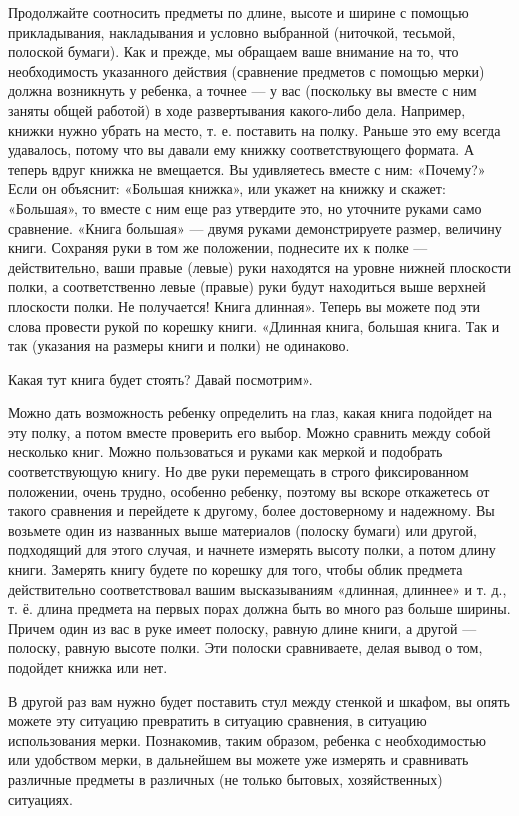 \documentclass{book}
\begin{document}
Продолжайте соотносить предметы по длине, высоте и ширине с помощью
прикладывания, накладывания и условно выбранной (ниточкой, тесьмой,
полоской бумаги). Как и прежде, мы обращаем ваше внимание на то, что
необходимость указанного действия (сравнение предметов с помощью мерки)
должна возникнуть у ребенка, а точнее --- у вас (поскольку вы вместе с
ним заняты общей работой) в ходе развертывания какого-либо дела.
Например, книжки нужно убрать на место, т. е. поставить на полку. Раньше
это ему всегда удавалось, потому что вы давали ему книжку
соответствующего формата. А теперь вдруг книжка не вмещается. Вы
удивляетесь вместе с ним: «Почему?» Если он объяснит: «Большая книжка»,
или укажет на книжку и скажет: «Большая», то вместе с ним еще раз
утвердите это, но уточните руками само сравнение. «Книга большая» ---
двумя руками демонстрируете размер, величину книги. Сохраняя руки в том
же положении, поднесите их к полке --- действительно, ваши правые
(левые) руки находятся на уровне нижней плоскости полки, а
соответственно левые (правые) руки будут находиться выше верхней
плоскости полки. Не получается! Книга длинная». Теперь вы можете под эти
слова провести рукой по корешку книги. «Длинная книга, большая книга.
Так и так (указания на размеры книги и полки) не одинаково.

Какая тут книга будет стоять? Давай посмотрим».

Можно дать возможность ребенку определить на глаз, какая книга подойдет
на эту полку, а потом вместе проверить его выбор. Можно сравнить между
собой несколько книг. Можно пользоваться и руками как меркой и подобрать
соответствующую книгу. Но две руки перемещать в строго фиксированном
положении, очень трудно, особенно ребенку, поэтому вы вскоре откажетесь
от такого сравнения и перейдете к другому, более достоверному и
надежному. Вы возьмете один из названных выше материалов (полоску
бумаги) или другой, подходящий для этого случая, и начнете измерять
высоту полки, а потом длину книги. Замерять книгу будете по корешку для
того, чтобы облик предмета действительно соответствовал вашим
высказываниям «длинная, длиннее» и т. д., т. ё. длина предмета на первых
порах должна быть во много раз больше ширины. Причем один из вас в руке
имеет полоску, равную длине книги, а другой --- полоску, равную высоте
полки. Эти полоски сравниваете, делая вывод о том, подойдет книжка или
нет.

В другой раз вам нужно будет поставить стул между стенкой и шкафом, вы
опять можете эту ситуацию превратить в ситуацию сравнения, в ситуацию
использования мерки. Познакомив, таким образом, ребенка с необходимостью
или удобством мерки, в дальнейшем вы можете уже измерять и сравнивать
различные предметы в различных (не только бытовых, хозяйственных)
ситуациях.
\end{document}
